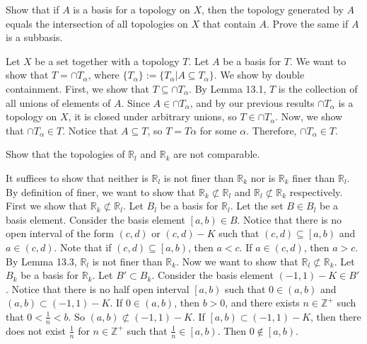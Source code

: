 \documentclass[12pt]{article}
\newenvironment{problem}[2][Problem]
{
	\begin{trivlist} 
		\item[\hskip \labelsep {\bfseries #1 #2:}]
	}
{
	\end{trivlist}
	}
\newenvironment{solution}[1][Solution]
{
	\begin{trivlist} 
		\item[\hskip \labelsep {\itshape #1:}]
	}
	{
	\end{trivlist}
}
\begin{document}
\begin{problem}[Exercise]{2.13.5}
	Show that if $A$ is a basis for a topology on $X$, then the topology generated by $A$ equals the intersection of all topologies on $X$ that contain $A$. Prove the same if $A$ is a subbasis. 
\end{problem}
\begin{solution}
	Let $X$ be a set together with a topology $T$. Let $A$ be a basis for $T$. We want to show that $T = \cap T_{\alpha}$, where $\lbrace{T_\alpha\rbrace} := \lbrace{T_\alpha | A \subseteq T_\alpha \rbrace}$. We show by double containment. First, we show that $T \subseteq \cap T_{\alpha}$. By Lemma 13.1, $T$ is the collection of all unions of elements of $A$. Since $A \in \cap T_{\alpha}$, and by our previous results $\cap T_{\alpha}$ is a topology on $X$, it is closed under arbitrary unions, so $T \in \cap T_{\alpha}$. Now, we show that $\cap T_\alpha \in T$. Notice that $A \subseteq T$, so $T = T\alpha$ for some $\alpha$. Therefore, $\cap T_\alpha \in T$. 
\end{solution}
\begin{problem}[Exercise]{2.13.6}
Show that the topologies of $\mathbb{R}_l$ and $\mathbb{R}_k$ are not comparable. 
\end{problem}
\begin{solution}
	It suffices to show that neither is $\mathbb{R}_l$ is not finer than $\mathbb{R}_k$ nor is $\mathbb{R}_k$ finer than $\mathbb{R}_l$. By definition of finer, we want to show that $\mathbb{R}_k \not\subset \mathbb{R}_l$ and $\mathbb{R}_l \not\subset \mathbb{R}_k$ respectively. First we show that  $\mathbb{R}_k \not\subset \mathbb{R}_l$. Let $B_l$ be a basis for $\mathbb{R}_l$. Let the set $B \in B_l$ be a basis element. Consider the basis element $\left[a,b\right) \in B$. Notice that there is no open interval of the form $(c,d)$ or $(c,d)- K$ such that $(c,d) \subseteq \left[a,b\right)$ and $a \in (c,d)$. Note that if $(c,d) \subseteq \left[a, b\right)$, then $a < c$. If $a \in (c,d)$, then $a > c$. By Lemma 13.3, $\mathbb{R}_l$ is not finer than $\mathbb{R}_k$. Now we want to show that $\mathbb{R}_l \not\subset \mathbb{R}_k$. Let $B_k$ be a basis for $\mathbb{R}_k$. Let $B' \subset B_k$. Consider the basis element $(-1, 1) - K \in B'$. Notice that there is no half open interval $\left[a,b\right)$ such that $0 \in (a,b)$ and $(a,b) \subset (-1,1)- K$. If $0 \in (a,b)$, then $b > 0$, and there exists $n\in\mathbb{Z}^+$ such that $0 < \frac{1}{n} < b$. So $(a,b) \not\subset (-1,1) - K$. If $\left[a,b\right) \subset (-1,1) -K$, then there does not exist $\frac{1}{n}$ for $n \in \mathbb{Z}^+$ such that $\frac{1}{n} \in \left[a, b\right)$. Then $0 \notin \left[a, b\right)$. 
\end{solution}
\end{document}
